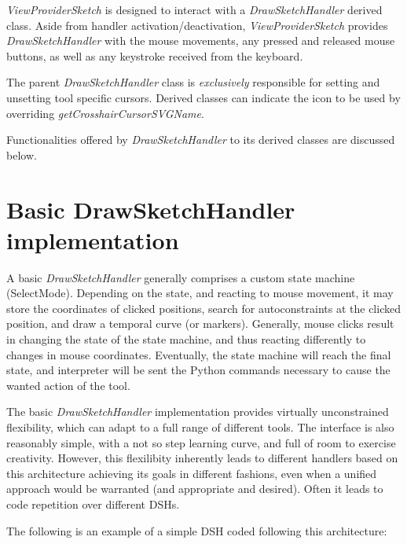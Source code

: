 \documentclass[12pt,twoside,a4paper]{book}
\newcommand{\DrawSketchHandler}{\emph{DrawSketchHandler}}
\newcommand{\ViewProviderSketch}{\emph{ViewProviderSketch}}
\begin{document}
    \ViewProviderSketch{} is designed to interact with a \DrawSketchHandler{} derived class. Aside from handler activation/deactivation, \ViewProviderSketch{} provides \DrawSketchHandler{} with the mouse movements, any pressed and released mouse buttons, as well as any keystroke received from the keyboard.

    The parent \DrawSketchHandler{} class is \emph{exclusively} responsible for setting and unsetting tool specific cursors. Derived classes can indicate the icon to be used by overriding \emph{getCrosshairCursorSVGName}.

    Functionalities offered by \DrawSketchHandler{} to its derived classes are discussed below.

    \section{Basic DrawSketchHandler implementation}
    \label{sec:BasicDSHA:Implementation}

    A basic \DrawSketchHandler{} generally comprises a custom state machine (SelectMode). Depending on the state, and reacting to mouse movement, it may store the coordinates of clicked positions, search for autoconstraints at the clicked position, and draw a temporal curve (or markers). Generally, mouse clicks result in changing the state of the state machine, and thus reacting differently to changes in mouse coordinates. Eventually, the state machine will reach the final state, and interpreter will be sent the Python commands necessary to cause the wanted action of the tool.

    The basic \DrawSketchHandler{} implementation provides virtually unconstrained flexibility, which can adapt to a full range of different tools. The interface is also reasonably simple, with a not so step learning curve, and full of room to exercise creativity. However, this flexilibity inherently leads to different handlers based on this architecture achieving its goals in different fashions, even when a unified approach would be warranted (and appropriate and desired). Often it leads to code repetition over different DSHs.

    The following is an example of a simple DSH coded following this architecture:
\end{document}
